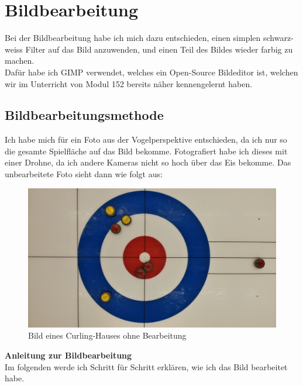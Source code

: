 \documentclass[11pt]{article}
\begin{document}
    \section{Bildbearbeitung}
    Bei der Bildbearbeitung habe ich mich dazu entschieden, einen simplen schwarz-weiss Filter auf das Bild
    anzuwenden, und einen Teil des Bildes wieder farbig zu machen.\\
    Dafür habe ich GIMP verwendet, welches ein Open-Source Bildeditor ist, welchen wir im Unterricht von Modul
    152 bereits näher kennengelernt haben.


    \subsection{Bildbearbeitungsmethode}
    Ich habe mich für ein Foto aus der Vogelperspektive entschieden, da ich nur so die gesamte Spielfläche
    auf das Bild bekomme. Fotografiert habe ich dieses mit einer Drohne, da ich andere Kameras nicht so hoch
    über das Eis bekomme. Das unbearbeitete Foto sieht dann wie folgt aus:\\
    \begin{figure}[h]
        \includegraphics[width=\textwidth]{media/unedited}
        \caption{Bild eines Curling-Hauses ohne Bearbeitung}
    \end{figure}

    \pagebreak

    \textbf{Anleitung zur Bildbearbeitung}\\
    Im folgenden werde ich Schritt für Schritt erklären, wie ich das Bild bearbeitet habe.
\end{document}
